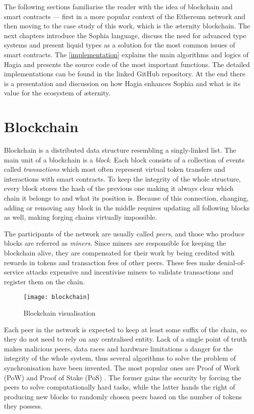 The following sections familiarise the reader with the idea of blockchain and
smart contracts --- first in a more popular context of the Ethereum network and
then moving to the case study of this work, which is the {\ae}ternity
blockchain. The next chapters introduce the Sophia language, discuss the need
for advanced type systems and present liquid types as a solution for the most
common issues of smart contracts. The \autoref{implementation} explains the main
algorithms and logics of Hagia and presents the source code of the most
important functions. The detailed implementations can be found in the linked
GitHub repository. At the end there is a presentation and discussion on how
Hagia enhances Sophia and what is its value for the ecosystem of {\ae}ternity.

\section{Blockchain}

Blockchain is a distributed data structure resembling a singly-linked list. The
main unit of a blockchain is a \emph{block}. Each block consists of a collection
of events called \emph{transactions} which most often represent virtual token
transfers and interactions with smart contracts. To keep the integrity of the
whole structure, every block stores the hash of the previous one making it
always clear which chain it belongs to and what its position is. Because of this
connection, changing, adding or removing any block in the middle requires
updating all following blocks as well, making forging chains virtually
impossible.

The participants of the network are usually called \emph{peers}, and those who
produce blocks are referred as \emph{miners}. Since miners are responsible for
keeping the blockchain alive, they are compensated for their work by being
credited with rewards in tokens and transaction fees of other peers. These fees
make denial-of-service attacks expensive and incentivise miners to validate
transactions and register them on the chain.

\begin{figure}[h]
  \caption{Blockchain visualisation}
  \centering
  \texttt{[image: blockchain]}
\end{figure}

Each peer in the network is expected to keep at least some suffix of the chain,
so they do not need to rely on any centralised entity. Lack of a single point of
truth makes malicious peers, data races and hardware limitations a danger for
the integrity of the whole system, thus several algorithms to solve the problem
of synchronisation have been invented. The most popular ones are Proof of Work
(PoW) \cite{Nakamoto:2008:BPP} and Proof of Stake (PoS) \cite{King:2012:PPP}.
The former gains the security by forcing the peers to solve computationally hard
tasks, while the latter hands the right of producing new blocks to randomly
chosen peers based on the number of tokens they possess.

